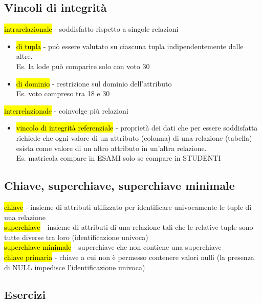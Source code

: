 \documentclass[a4paper]{article}
\begin{document}
\subsection{Vincoli di integrità}
\hl{intrarelazionale} - soddisfatto rispetto a singole relazioni
\begin{itemize}
  \item[] \hl{di tupla} -  può essere valutato su ciascuna tupla indipendentemente dalle altre.\\
  Es. la lode può comparire solo con voto 30
  \item[] \hl{di dominio} - restrizione sul dominio dell’attributo\\
  Es. voto compreso tra 18 e 30
\end{itemize}
\hl{interrelazionale} - coinvolge più relazioni
\begin{itemize}
  \item[] \hl{vincolo di integrità referenziale} - proprietà dei dati che per essere soddisfatta richiede che ogni valore di un attributo (colonna) di una relazione (tabella) esista come valore di un altro attributo in un'altra relazione.\\
  Es. matricola compare in ESAMI solo se compare in STUDENTI
\end{itemize}\par \subsection{Chiave, superchiave, superchiave minimale}
\hl{chiave} - insieme di attributi utilizzato per identificare univocamente le tuple di una relazione\medskip\\
\hl{superchiave} - insieme di attributi di una relazione tali che le relative tuple sono tutte diverse tra loro (identificazione univoca)\medskip\\
\hl{superchiave minimale} - superchiave che non contiene una superchiave\medskip\\
\hl{chiave primaria} - chiave a cui non è permesso contenere valori nulli (la presenza di NULL impedisce l’identificazione univoca)\par \subsection{Esercizi}
\end{document}
